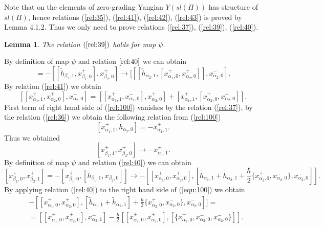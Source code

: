 \documentclass[english]{elsarticle}
\newtheorem{lemma}{Lemma}[section]
\numberwithin{equation}{section}
\begin{document}
Note that on the elements of zero-grading Yangian $Y(sl(\Pi))$ has structure of $sl(\Pi)$, hence relations
(\ref{rel:35}), (\ref{rel:41}), (\ref{rel:42}), (\ref{rel:43}) is proved by Lemma 4.1.2. Thus we only need to prove relations (\ref{rel:37}), (\ref{rel:39}), (\ref{rel:40}).
\begin{lemma}
\label{lemma:4.10}
    The relation $(\ref{rel:39})$ holds for map $\psi$.
\end{lemma}

By definition of map $\psi$ and relation $\ref{rel:40}$ we can obtain
\begin{equation}
[x_{\beta_1,1}^+,x_{\beta_2,0}^+] = -[[\tilde{h}_{\beta_2,1},x_{\beta_1,0}^+],x_{\beta_2,0}^+] \rightarrow [[[\tilde{h}_{\alpha_2,1},[x_{\alpha_1,0}^+,x_{\alpha_2,0}^+]],x_{\alpha_2,0}^-].
\end{equation}
By relation (\ref{rel:41}) we obtain
\begin{equation}
\label{rel:100}
[[x_{\alpha_1,1}^+,x_{\alpha_2,0}^+],x_{\alpha_2,0}^-]= [[x_{\alpha_1,1}^+,x_{\alpha_2,0}^-],x_{\alpha_2,0}^+]+[x_{\alpha_1,1}^+,[x_{\alpha_2,0}^+,x_{\alpha_2,0}^-]].
\end{equation}
First term of right hand side of (\ref{rel:100}) vanishes by the relation (\ref{rel:37}), by the relation (\ref{rel:36}) we obtain the following relation from (\ref{rel:100})
\begin{equation}
\label{rel:98}
    [x_{\alpha_1,1}^+, h_{\alpha_2,0}] = -x_{\alpha_1,1}^+.
\end{equation}
Thus we obtained
\begin{equation}
\label{midres:1}
[x_{\beta_1,1}^+,x_{\beta_2,0}^+]\rightarrow -x_{\alpha_1,1}^+.
\end{equation}
By definition of map $\psi$ and relation (\ref{rel:40}) we can obtain
\begin{equation}
\label{equ:100}
[x_{\beta_1,0}^+,x_{\beta_2,1}^+]=-[x_{\beta_1,0}^+,[\tilde{h}_{\beta_1,1},x_{\beta_2,0}]]\rightarrow -[[x_{\alpha_1,0}^+,x_{\alpha_2,0}^+],[\tilde{h}_{\alpha_1,1}+\tilde{h}_{\alpha_2,1}+ \frac{\hbar}{2}\{x_{\alpha_{2},0}^{+},x_{\alpha_{2},0}^{-}\},x_{\alpha_2,0}^-]].
\end{equation}
By applying relation (\ref{rel:40}) to the right hand side of (\ref{equ:100}) we obtain
\begin{equation}
\label{equ:101}
\begin{split}
&-[[x_{\alpha_1,0}^+,x_{\alpha_2,0}^+],[\tilde{h}_{\alpha_1,1}+\tilde{h}_{\alpha_2,1}]
 +\frac{\hbar}{2}\{x_{\alpha_{2},0}^{+},x_{\alpha_{2},0}^{-}\},x_{\alpha_2,0}^-]]=\\
&=[[x_{\alpha_{1},0}^{+},x_{\alpha_{2},0}^{+}],x_{\alpha_{2},1}^{-}]- \frac{\hbar}{2}[[x_{\alpha_{1},0}^{+},x_{\alpha_{2},0}^{+}],[\{x_{\alpha_{2},0}^{+},x_{\alpha_{2},0}^{-},x_{\alpha_{2},0}^{-}\}]].
\end{split}
\end{equation}
\end{document}
